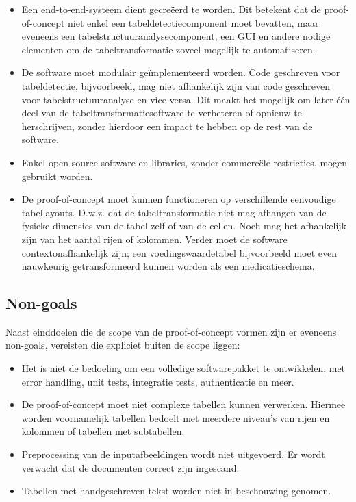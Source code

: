 \begin{itemize}
    \item Een end-to-end-systeem dient gecreëerd te worden. Dit betekent dat de proof-of-concept niet enkel een tabeldetectiecomponent moet bevatten, maar eveneens een tabelstructuuranalysecomponent, een GUI en andere nodige elementen om de tabeltransformatie zoveel mogelijk te automatiseren.\\

    \item De software moet modulair geïmplementeerd worden. Code geschreven voor tabeldetectie, bijvoorbeeld, mag niet afhankelijk zijn van code geschreven voor tabelstructuuranalyse en vice versa. Dit maakt het mogelijk om later één deel van de tabeltransformatiesoftware te verbeteren of opnieuw te herschrijven, zonder hierdoor een impact te hebben op de rest van de software.\\

    \item Enkel open source software en libraries, zonder commercële restricties, mogen gebruikt worden.\\

    \item De proof-of-concept moet kunnen functioneren op verschillende eenvoudige tabellayouts. D.w.z. dat de tabeltransformatie niet mag afhangen van de fysieke dimensies van de tabel zelf of van de cellen. Noch mag het afhankelijk zijn van het aantal rijen of kolommen. Verder moet de software contextonafhankelijk zijn; een voedingswaardetabel bijvoorbeeld moet even nauwkeurig getransformeerd kunnen worden als een medicatieschema.
\end{itemize}

\subsection{Non-goals}

Naast einddoelen die de scope van de proof-of-concept vormen zijn er eveneens non-goals, vereisten die expliciet buiten de scope liggen:

\begin{itemize}
    \item Het is niet de bedoeling om een volledige softwarepakket te ontwikkelen, met error handling, unit tests, integratie tests, authenticatie en meer.\\

    \item De proof-of-concept moet niet complexe tabellen kunnen verwerken. Hiermee worden voornamelijk tabellen bedoelt met meerdere niveau's van rijen en kolommen of tabellen met subtabellen.\\

    \item Preprocessing van de inputafbeeldingen wordt niet uitgevoerd. Er wordt verwacht dat de documenten correct zijn ingescand.\\

    \item Tabellen met handgeschreven tekst worden niet in beschouwing genomen.
\end{itemize}

